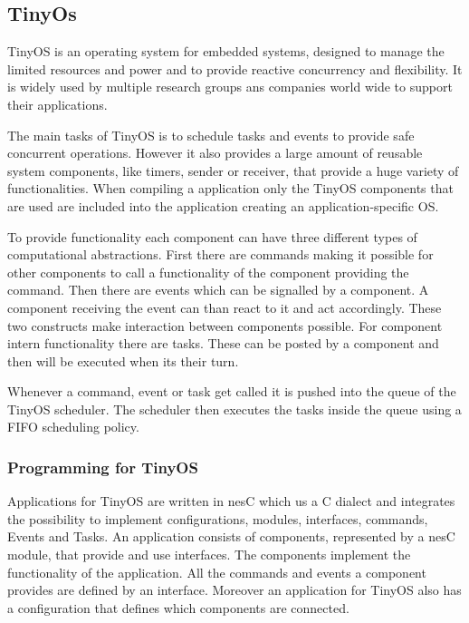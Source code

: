 \subsection{TinyOs}
TinyOS is an operating system for embedded systems, designed to manage the limited resources and power and to provide reactive concurrency and flexibility. It is widely used by multiple research groups ans companies world wide to support their applications.

The main tasks of TinyOS is to schedule tasks and events to provide safe concurrent operations. However it also provides a large amount of reusable system components, like timers, sender or receiver, that provide a huge variety of functionalities. When compiling a application only the TinyOS components that are used are included into the application creating an application-specific OS.

To provide functionality each component can have three different types of computational abstractions. First there are commands making it possible for other components to call a functionality of the component providing the command. Then there are events which can be signalled by a component. A component receiving the event can than react to it and act accordingly. These two constructs make interaction between components possible. For component intern functionality there are tasks. These can be posted by a component and then will be executed when its their turn. 

Whenever a command, event or task get called it is pushed into the queue of the TinyOS scheduler. The scheduler then executes the tasks inside the queue using a FIFO scheduling policy.    

\subsubsection{Programming for TinyOS}
Applications for TinyOS are written in nesC which us a C dialect and integrates the possibility to implement configurations, modules, interfaces, commands, Events and Tasks. An application consists of components, represented by a nesC module, that provide and use interfaces. The components implement the functionality of the application. All the commands and events a component provides are defined by an interface. Moreover an application for TinyOS also has a configuration that defines which components are connected.   


